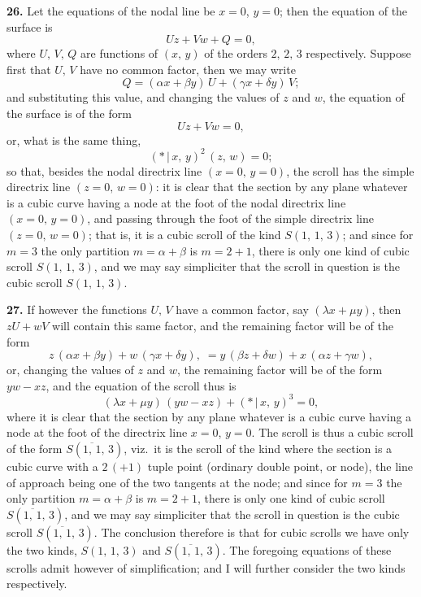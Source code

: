 \documentclass[11pt,a4paper]{article}
\providecommand{\mid}{\,|\,}
\begin{document}
\medskip

\textbf{26.} Let the equations of the nodal line be $x = 0$, $y = 0$; then the equation of the surface is
\[
Uz + Vw + Q = 0,
\]
where $U,\,V,\,Q$ are functions of $(x,\,y)$ of the orders $2,\,2,\,3$ respectively. Suppose first that $U,\,V$ have no common factor, then we may write
\[
Q = (\alpha x + \beta y)\,U + (\gamma x + \delta y)\,V;
\]
and substituting this value, and changing the values of $z$ and $w$, the equation of the surface is of the form
\[
Uz + Vw = 0,
\]
or, what is the same thing,
\[
(*\mid x,\,y)^{2}\,(z,\,w) = 0;
\]
so that, besides the nodal directrix line $(x = 0,\,y = 0)$, the scroll has the simple directrix line $(z = 0,\,w = 0)$: it is clear that the section by any plane whatever is a cubic curve having a node at the foot of the nodal directrix line $(x = 0,\,y = 0)$, and passing through the foot of the simple directrix line $(z = 0,\,w = 0)$; that is, it is a cubic scroll of the kind $S(1,\,1,\,3)$; and since for $m = 3$ the only partition $m = \alpha + \beta$ is $m = 2 + 1$, there is only one kind of cubic scroll $S(1,\,1,\,3)$, and we may say simpliciter that the scroll in question is the cubic scroll $S(1,\,1,\,3)$.

\medskip

\textbf{27.} If however the functions $U,\,V$ have a common factor, say $(\lambda x + \mu y)$, then $zU + wV$ will contain this same factor, and the remaining factor will be of the form
\[
z\,(\alpha x + \beta y) + w\,(\gamma x + \delta y),\; = y\,(\beta z + \delta w) + x\,(\alpha z + \gamma w),
\]
or, changing the values of $z$ and $w$, the remaining factor will be of the form $yw - xz$, and the equation of the scroll thus is
\[
(\lambda x + \mu y)\,(yw - xz) + (*\mid x,\,y)^{3} = 0,
\]
where it is clear that the section by any plane whatever is a cubic curve having a node at the foot of the directrix line $x = 0$, $y = 0$. The scroll is thus a cubic scroll of the form $S(\overline{1,\,1},\,3)$, viz.\ it is the scroll of the kind where the section is a cubic curve with a $2\,(+1)$ tuple point (ordinary double point, or node), the line of approach being one of the two tangents at the node; and since for $m = 3$ the only partition $m = \alpha + \beta$ is $m = 2 + 1$, there is only one kind of cubic scroll $S(\overline{1,\,1},\,3)$, and we may say simpliciter that the scroll in question is the cubic scroll $S(\overline{1,\,1},\,3)$. The conclusion therefore is that for cubic scrolls we have only the two kinds, $S(1,\,1,\,3)$ and $S(\overline{1,\,1},\,3)$. The foregoing equations of these scrolls admit however of simplification; and I will further consider the two kinds respectively.
\end{document}
